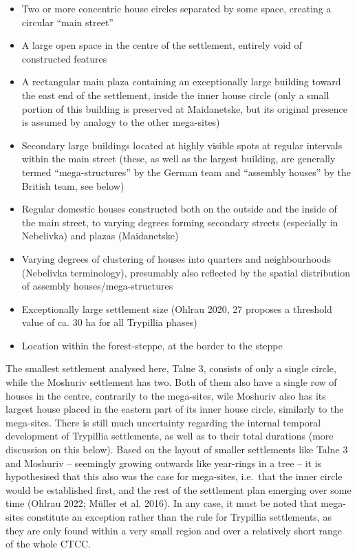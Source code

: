 \documentclass[
  12pt,
  a4paper, twoside]{book}
\begin{document}
\begin{itemize}
\item
  Two or more concentric house circles separated by some space, creating a circular ``main street''
\item
  A large open space in the centre of the settlement, entirely void of constructed features
\item
  A rectangular main plaza containing an exceptionally large building toward the east end of the settlement, inside the inner house circle (only a small portion of this building is preserved at Maidanetske, but its original presence is assumed by analogy to the other mega-sites)
\item
  Secondary large buildings located at highly visible spots at regular intervals within the main street (these, as well as the largest building, are generally termed ``mega-structures'' by the German team and ``assembly houses'' by the British team, see below)
\item
  Regular domestic houses constructed both on the outside and the inside of the main street, to varying degrees forming secondary streets (especially in Nebelivka) and plazas (Maidanetske)
\item
  Varying degrees of clustering of houses into quarters and neighbourhoods (Nebelivka terminology), presumably also reflected by the spatial distribution of assembly houses/mega-structures
\item
  Exceptionally large settlement size (Ohlrau 2020, 27 proposes a threshold value of ca. 30 ha for all Trypillia phases)
\item
  Location within the forest-steppe, at the border to the steppe
\end{itemize}

The smallest settlement analysed here, Talne 3, consists of only a single circle, while the Moshuriv settlement has two. Both of them also have a single row of houses in the centre, contrarily to the mega-sites, wile Moshuriv also has its largest house placed in the eastern part of its inner house circle, similarly to the mega-sites. There is still much uncertainty regarding the internal temporal development of Trypillia settlements, as well as to their total durations (more discussion on this below). Based on the layout of smaller settlements like Talne 3 and Moshuriv -- seemingly growing outwards like year-rings in a tree -- it is hypothesised that this also was the case for mega-sites, i.e.~that the inner circle would be established first, and the rest of the settlement plan emerging over some time (Ohlrau 2022; Müller et al. 2016). In any case, it must be noted that mega-sites constitute an exception rather than the rule for Trypillia settlements, as they are only found within a very small region and over a relatively short range of the whole CTCC.
\end{document}
